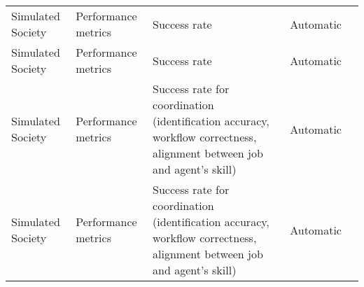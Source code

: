 \begin{small}
\begin{center}
\begin{longtable}{@{}p{}p{}p{}p{}p{}@{}}
Simulated Society        & Performance metrics                 & Success rate                                                                                                                                                                                                & Automatic & \cite{li2023metaagentssimulatinginteractionshuman}                                                                                                                                                                                                                                                                                                                                                                                          \\
Simulated Society        & Performance metrics                 & Success rate                                                                                                                                                                                                & Automatic & \cite{li2023metaagentssimulatinginteractionshuman}                                                                                                                                                                                                                                                                                                                                                                                          \\
Simulated Society        & Performance metrics                 & Success rate for coordination (identification accuracy, workflow correctness, alignment between job and agent's skill)                                                                                      & Automatic & \cite{Li2023MetaAgentsSI}                                                                                                                                                                                                                                                                                                                                                                                                  \\
Simulated Society        & Performance metrics                 & Success rate for coordination (identification accuracy, workflow correctness, alignment between job and agent's skill)                                                                                      & Automatic & \cite{Li2023MetaAgentsSI}                                                                                                                                                                                                                                                                                                                                                                                                  \\

\end{longtable}
\end{center}
\end{small}
